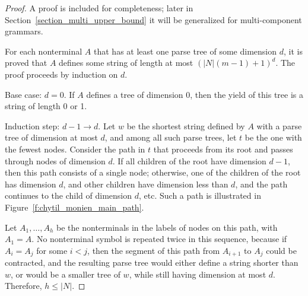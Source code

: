 \documentclass[runningheads]{llncs}
\begin{document}
\begin{proof}
A proof is included for completeness;
later in Section~\ref{section_multi_upper_bound}
it will be generalized for multi-component grammars.

For each nonterminal $A$ that has at least one parse tree of some dimension $d$,
it is proved that $A$ defines some string of length at most $(|N|(m-1) + 1)^d$.
The proof proceeds by induction on $d$.

Base case: $d=0$.
If $A$ defines a tree of dimension 0,
then the yield of this tree is a string of length 0 or 1.

Induction step: $d -1 \to d$.
Let $w$ be the shortest string defined by $A$ with a parse tree of dimension at most $d$,
and among all such parse trees, let $t$ be the one with the fewest nodes.
Consider the path in $t$ that proceeds from its root
and passes through nodes of dimension $d$.
If all children of the root have dimension $d-1$,
then this path consists of a single node;
otherwise, one of the children of the root has dimension $d$,
and other children have dimension less than $d$,
and the path continues to the child of dimension $d$, etc.
Such a path is illustrated in Figure~\ref{f:chytil_monien_main_path}.

Let $A_1, \ldots, A_h$ be the nonterminals in the labels of nodes on this path,
with $A_1=A$.
No nonterminal symbol is repeated twice in this sequence,
because if $A_i=A_j$ for some $i<j$,
then the segment of this path from $A_{i+1}$ to $A_j$
could be contracted,
and the resulting parse tree would either define a string shorter than $w$,
or would be a smaller tree of $w$,
while still having dimension at most $d$.
Therefore, $h \leqslant |N|$.


\end{proof}
\end{document}
